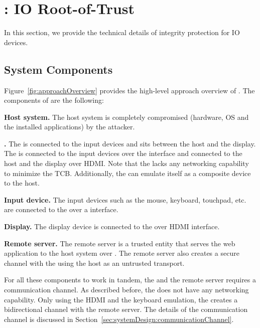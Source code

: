 \section{\name: IO Root-of-Trust}
\label{sec:systemDesign}


In this section, we provide the technical details of \name integrity protection for IO devices.  

\subsection{System Components}
\label{sec:systemDesign:components}

Figure~\ref{fig:approachOverview} provides the high-level approach overview of \name. The components of \name are the following:

\begin{mylist}
  \item \textbf{Host system.} The host system is completely compromised (hardware, OS and the installed applications) by the attacker.
  \item \textbf{\device.} The \device is connected to the input devices and sits between the host and the display. The \device is connected to the input devices over the \usb interface and connected to the host and the display over HDMI. Note that the \device lacks any networking capability to minimize the TCB. Additionally, the \device can emulate itself as a composite \usb device to the host.
  \item \textbf{Input device.} The input devices such as the mouse, keyboard, touchpad, etc. are connected to the \device over a \usb interface.
  \item \textbf{Display.} The display device is connected to the \device over HDMI interface.
  \item \textbf{Remote server.} The remote server is a trusted entity that serves the web application to the host system over \http. The remote server also creates a secure channel with the \device using the host as an untrusted transport. 
  
\end{mylist}

For all these components to work in tandem, the \device and the remote server requires a communication channel. As described before, the \device does not have any networking capability. Only using the HDMI and the keyboard emulation, the \device creates a bidirectional channel with the remote server. The details of the communication channel is discussed in Section~\ref{sec:systemDesign:communicationChannel}.


